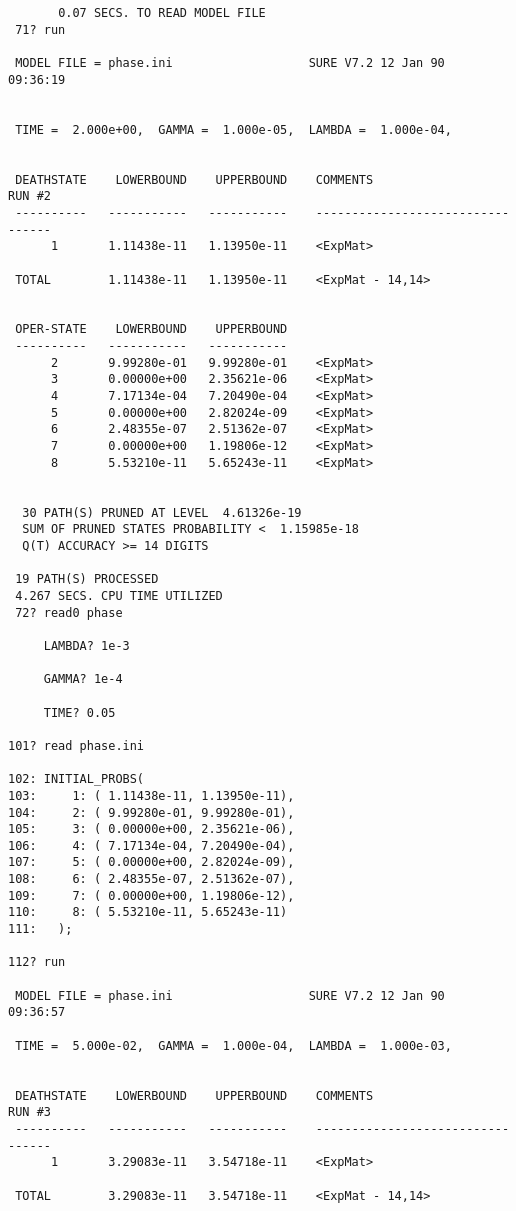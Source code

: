 \begin{verbatim}
       0.07 SECS. TO READ MODEL FILE
 71? run

 MODEL FILE = phase.ini                   SURE V7.2 12 Jan 90   09:36:19


 TIME =  2.000e+00,  GAMMA =  1.000e-05,  LAMBDA =  1.000e-04,  
 

 DEATHSTATE    LOWERBOUND    UPPERBOUND    COMMENTS                 RUN #2
 ----------   -----------   -----------    ---------------------------------
      1       1.11438e-11   1.13950e-11    <ExpMat>

 TOTAL        1.11438e-11   1.13950e-11    <ExpMat - 14,14>


 OPER-STATE    LOWERBOUND    UPPERBOUND
 ----------   -----------   -----------
      2       9.99280e-01   9.99280e-01    <ExpMat>
      3       0.00000e+00   2.35621e-06    <ExpMat>
      4       7.17134e-04   7.20490e-04    <ExpMat>
      5       0.00000e+00   2.82024e-09    <ExpMat>
      6       2.48355e-07   2.51362e-07    <ExpMat>
      7       0.00000e+00   1.19806e-12    <ExpMat>
      8       5.53210e-11   5.65243e-11    <ExpMat>


  30 PATH(S) PRUNED AT LEVEL  4.61326e-19
  SUM OF PRUNED STATES PROBABILITY <  1.15985e-18
  Q(T) ACCURACY >= 14 DIGITS

 19 PATH(S) PROCESSED
 4.267 SECS. CPU TIME UTILIZED
 72? read0 phase

     LAMBDA? 1e-3

     GAMMA? 1e-4

     TIME? 0.05

101? read phase.ini

102: INITIAL_PROBS(
103:     1: ( 1.11438e-11, 1.13950e-11),
104:     2: ( 9.99280e-01, 9.99280e-01),
105:     3: ( 0.00000e+00, 2.35621e-06),
106:     4: ( 7.17134e-04, 7.20490e-04),
107:     5: ( 0.00000e+00, 2.82024e-09),
108:     6: ( 2.48355e-07, 2.51362e-07),
109:     7: ( 0.00000e+00, 1.19806e-12),
110:     8: ( 5.53210e-11, 5.65243e-11)
111:   ); 

112? run

 MODEL FILE = phase.ini                   SURE V7.2 12 Jan 90   09:36:57

 TIME =  5.000e-02,  GAMMA =  1.000e-04,  LAMBDA =  1.000e-03,  
 

 DEATHSTATE    LOWERBOUND    UPPERBOUND    COMMENTS                 RUN #3
 ----------   -----------   -----------    ---------------------------------
      1       3.29083e-11   3.54718e-11    <ExpMat>

 TOTAL        3.29083e-11   3.54718e-11    <ExpMat - 14,14>



\end{verbatim}
